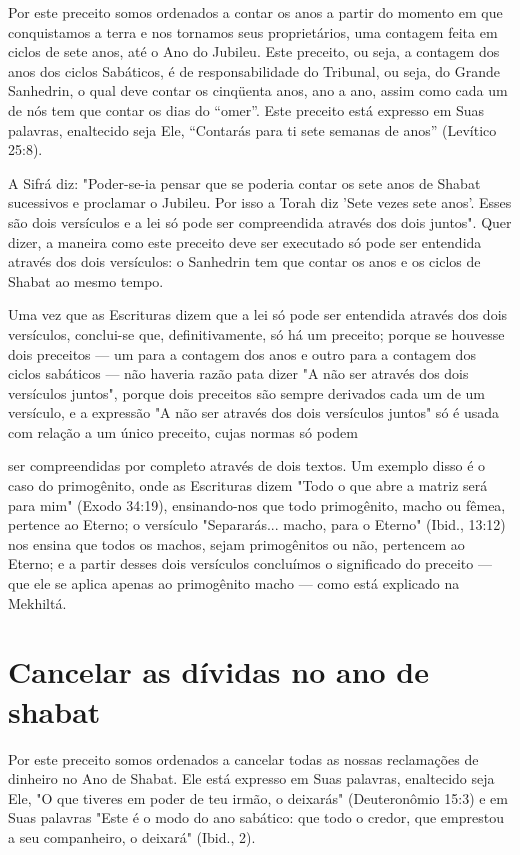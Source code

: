Por este preceito somos ordenados a contar os anos a partir do mo­mento
em que conquistamos a terra e nos tornamos seus proprietários, uma
contagem feita em ciclos de sete anos, até o Ano do Jubileu. Este
preceito, ou seja, a contagem dos anos dos ciclos Sabáticos, é de
responsabilidade do Tribu­nal, ou seja, do Grande Sanhedrin, o qual deve
contar os cinqüenta anos, ano a ano, assim como cada um de nós tem que
contar os dias do ``omer''. Este preceito está expresso em Suas palavras,
enaltecido seja Ele, ``Contarás para ti sete semanas de anos'' (Levítico
25:8).

A Sifrá diz: "Poder-se-ia pensar que se poderia contar os sete anos de
Shabat sucessivos e proclamar o Jubileu. Por isso a Torah diz 'Sete
vezes sete anos'. Esses são dois versículos e a lei só pode ser
compreendida através dos dois juntos". Quer dizer, a maneira como este
preceito deve ser executado só pode ser entendida através dos dois
versículos: o Sanhedrin tem que contar os anos e os ciclos de Shabat ao
mesmo tempo.

Uma vez que as Escrituras dizem que a lei só pode ser entendida atra­vés
dos dois versículos, conclui-se que, definitivamente, só há um preceito;
por­que se houvesse dois preceitos --- um para a contagem dos anos e
outro para a contagem dos ciclos sabáticos --- não haveria razão pata
dizer "A não ser atra­vés dos dois versículos juntos", porque dois
preceitos são sempre derivados cada um de um versículo, e a expressão "A
não ser através dos dois versículos juntos" só é usada com relação a um
único preceito, cujas normas só podem



ser compreendidas por completo através de dois textos. Um exemplo disso
é o caso do primogênito, onde as Escrituras dizem "Todo o que abre a
matriz será para mim" (Exodo 34:19), ensinando-nos que todo primogênito,
macho ou fêmea, pertence ao Eterno; o versículo "Separarás... macho,
para o Eterno" (Ibid., 13:12) nos ensina que todos os machos, sejam
primogênitos ou não, per­tencem ao Eterno; e a partir desses dois
versículos concluímos o significado do preceito --- que ele se aplica
apenas ao primogênito macho --- como está explicado na Mekhiltá.

\section{Cancelar as dívidas no ano de shabat}

Por este preceito somos ordenados a cancelar todas as nossas
recla­mações de dinheiro no Ano de Shabat. Ele está expresso em Suas
palavras, enal­tecido seja Ele, "O que tiveres em poder de teu irmão, o
deixarás" (Deuteronô­mio 15:3) e em Suas palavras "Este é o modo do ano
sabático: que todo o cre­dor, que emprestou a seu companheiro, o
deixará" (Ibid., 2).


